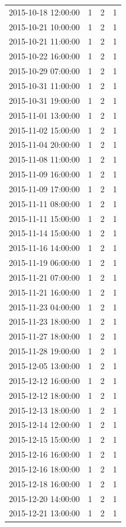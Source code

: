 \begin{tabular}{lrrr}
2015-10-18 12:00:00 & 1 & 2 & 1 \\
2015-10-21 10:00:00 & 1 & 2 & 1 \\
2015-10-21 11:00:00 & 1 & 2 & 1 \\
2015-10-22 16:00:00 & 1 & 2 & 1 \\
2015-10-29 07:00:00 & 1 & 2 & 1 \\
2015-10-31 11:00:00 & 1 & 2 & 1 \\
2015-10-31 19:00:00 & 1 & 2 & 1 \\
2015-11-01 13:00:00 & 1 & 2 & 1 \\
2015-11-02 15:00:00 & 1 & 2 & 1 \\
2015-11-04 20:00:00 & 1 & 2 & 1 \\
2015-11-08 11:00:00 & 1 & 2 & 1 \\
2015-11-09 16:00:00 & 1 & 2 & 1 \\
2015-11-09 17:00:00 & 1 & 2 & 1 \\
2015-11-11 08:00:00 & 1 & 2 & 1 \\
2015-11-11 15:00:00 & 1 & 2 & 1 \\
2015-11-14 15:00:00 & 1 & 2 & 1 \\
2015-11-16 14:00:00 & 1 & 2 & 1 \\
2015-11-19 06:00:00 & 1 & 2 & 1 \\
2015-11-21 07:00:00 & 1 & 2 & 1 \\
2015-11-21 16:00:00 & 1 & 2 & 1 \\
2015-11-23 04:00:00 & 1 & 2 & 1 \\
2015-11-23 18:00:00 & 1 & 2 & 1 \\
2015-11-27 18:00:00 & 1 & 2 & 1 \\
2015-11-28 19:00:00 & 1 & 2 & 1 \\
2015-12-05 13:00:00 & 1 & 2 & 1 \\
2015-12-12 16:00:00 & 1 & 2 & 1 \\
2015-12-12 18:00:00 & 1 & 2 & 1 \\
2015-12-13 18:00:00 & 1 & 2 & 1 \\
2015-12-14 12:00:00 & 1 & 2 & 1 \\
2015-12-15 15:00:00 & 1 & 2 & 1 \\
2015-12-16 16:00:00 & 1 & 2 & 1 \\
2015-12-16 18:00:00 & 1 & 2 & 1 \\
2015-12-18 16:00:00 & 1 & 2 & 1 \\
2015-12-20 14:00:00 & 1 & 2 & 1 \\
2015-12-21 13:00:00 & 1 & 2 & 1 \\

\end{tabular}
